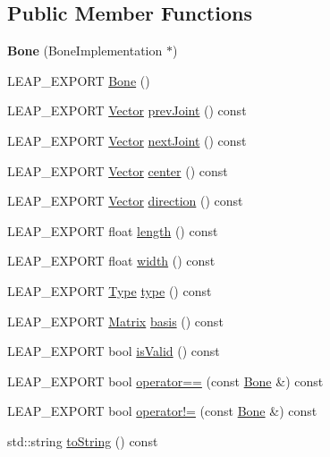 \subsection*{Public Member Functions}
\begin{DoxyCompactItemize}
\item 
\mbox{\label{class_leap_1_1_bone_addaf061946589164faa9ad6c09899cd2}} 
{\bfseries Bone} (Bone\+Implementation $\ast$)
\item 
L\+E\+A\+P\+\_\+\+E\+X\+P\+O\+RT \hyperlink{class_leap_1_1_bone_ae2e654e7cdce4c22c27afe44ae8a424e}{Bone} ()
\item 
L\+E\+A\+P\+\_\+\+E\+X\+P\+O\+RT \hyperlink{struct_leap_1_1_vector}{Vector} \hyperlink{class_leap_1_1_bone_a4bb40ba22404ed3626969fd035773bf9}{prev\+Joint} () const
\item 
L\+E\+A\+P\+\_\+\+E\+X\+P\+O\+RT \hyperlink{struct_leap_1_1_vector}{Vector} \hyperlink{class_leap_1_1_bone_a7122040fb8c15dfa2a99801394e054e1}{next\+Joint} () const
\item 
L\+E\+A\+P\+\_\+\+E\+X\+P\+O\+RT \hyperlink{struct_leap_1_1_vector}{Vector} \hyperlink{class_leap_1_1_bone_a0d81133eeea02f5586a927935d50027f}{center} () const
\item 
L\+E\+A\+P\+\_\+\+E\+X\+P\+O\+RT \hyperlink{struct_leap_1_1_vector}{Vector} \hyperlink{class_leap_1_1_bone_a15296070d028b684811d5aa555933ad7}{direction} () const
\item 
L\+E\+A\+P\+\_\+\+E\+X\+P\+O\+RT float \hyperlink{class_leap_1_1_bone_abc4a685582203d7dfed0b13e0cf7f117}{length} () const
\item 
L\+E\+A\+P\+\_\+\+E\+X\+P\+O\+RT float \hyperlink{class_leap_1_1_bone_a6275e4d9e6cbca6871a5dc21273ab329}{width} () const
\item 
L\+E\+A\+P\+\_\+\+E\+X\+P\+O\+RT \hyperlink{class_leap_1_1_bone_ac2f949e05b22edc21a308df42580b5e1}{Type} \hyperlink{class_leap_1_1_bone_aa4d62475c2bd1fd0ae8cf218d220d0d8}{type} () const
\item 
L\+E\+A\+P\+\_\+\+E\+X\+P\+O\+RT \hyperlink{struct_leap_1_1_matrix}{Matrix} \hyperlink{class_leap_1_1_bone_a057fbba7053f148cf3ae5f43f01ed9b8}{basis} () const
\item 
L\+E\+A\+P\+\_\+\+E\+X\+P\+O\+RT bool \hyperlink{class_leap_1_1_bone_a82b71f671aedac1eb3cf5ff4e762e963}{is\+Valid} () const
\item 
L\+E\+A\+P\+\_\+\+E\+X\+P\+O\+RT bool \hyperlink{class_leap_1_1_bone_ab76b765abf359b2c3e85d60a07673d55}{operator==} (const \hyperlink{class_leap_1_1_bone}{Bone} \&) const
\item 
L\+E\+A\+P\+\_\+\+E\+X\+P\+O\+RT bool \hyperlink{class_leap_1_1_bone_afd944f35b0d10e17e8a579a38f9ad260}{operator!=} (const \hyperlink{class_leap_1_1_bone}{Bone} \&) const
\item 
std\+::string \hyperlink{class_leap_1_1_bone_ae628cd1722bdef446ff37679b5f28481}{to\+String} () const
\end{DoxyCompactItemize}
